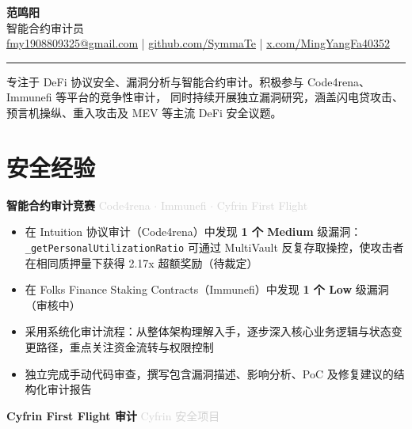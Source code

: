 \documentclass[8.5pt, a4paper]{article}
\begin{document}

\begin{center}
  {\Huge\bfseries\color{accent} 范鸣阳}\\[3pt]
  {\large\color{lightgray} 智能合约审计员}\\[4pt]
  \small
  \href{mailto:fmy1908809325@gmail.com}{fmy1908809325@gmail.com}
  \quad\textcolor{rulegray}{|}\quad
  \href{https://github.com/SymmaTe}{github.com/SymmaTe}
  \quad\textcolor{rulegray}{|}\quad
  \href{https://x.com/MingYangFa40352}{x.com/MingYangFa40352}
\end{center}

\vspace{1pt}
\noindent\color{rulegray}\rule{\textwidth}{0.6pt}
\vspace{2pt}

\noindent\small\color{lightgray}
专注于 DeFi 协议安全、漏洞分析与智能合约审计。积极参与 Code4rena、Immunefi 等平台的竞争性审计，
同时持续开展独立漏洞研究，涵盖闪电贷攻击、预言机操纵、重入攻击及 MEV 等主流 DeFi 安全议题。

\vspace{1pt}


\section{安全经验}

\noindent\textbf{智能合约审计竞赛} \hfill \textcolor{lightgray}{\small Code4rena $\cdot$ Immunefi $\cdot$ Cyfrin First Flight}

\begin{itemize}
  \item 在 Intuition 协议审计（Code4rena）中发现 \textbf{1 个 Medium} 级漏洞：\texttt{\_getPersonalUtilizationRatio} 可通过 MultiVault 反复存取操控，使攻击者在相同质押量下获得 2.17x 超额奖励（待裁定）
  \item 在 Folks Finance Staking Contracts（Immunefi）中发现 \textbf{1 个 Low} 级漏洞（审核中）
  \item 采用系统化审计流程：从整体架构理解入手，逐步深入核心业务逻辑与状态变更路径，重点关注资金流转与权限控制
  \item 独立完成手动代码审查，撰写包含漏洞描述、影响分析、PoC 及修复建议的结构化审计报告
\end{itemize}

\vspace{3pt}
\noindent\textbf{Cyfrin First Flight 审计} \hfill \textcolor{lightgray}{\small Cyfrin 安全项目}
\end{document}
